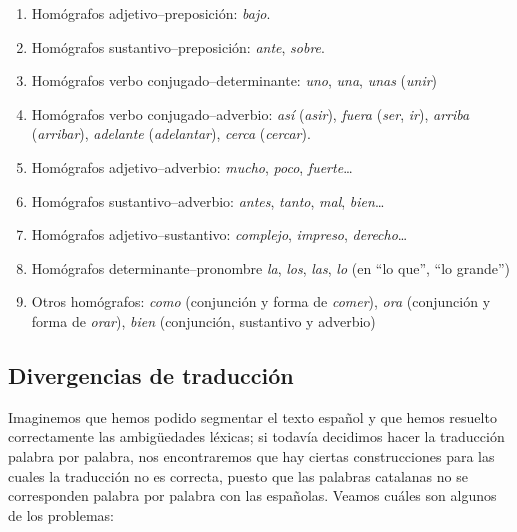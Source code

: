\begin{enumerate}
\item Homógrafos adjetivo--preposición: \emph{bajo}. 

\item Homógrafos sustantivo--preposición: \emph{ante}, \emph{sobre}. 

\item Homógrafos verbo conjugado--determinante: \emph{uno}, \emph{una}, \emph{unas} (\emph{unir}) 

\item Homógrafos verbo conjugado--adverbio: \emph{así} (\emph{asir}), \emph{fuera} (\emph{ser}, \emph{ir}), \emph{ arriba} (\emph{arribar}), {\em adelante} (\emph{adelantar}), \emph{cerca} (\emph{cercar}). 

\item Homógrafos adjetivo--adverbio: \emph{mucho}, \emph{poco}, {\em fuerte}\ldots 

\item Homógrafos sustantivo--adverbio: \emph{antes}, \emph{tanto}, \emph{mal}, \emph{bien}\ldots 

\item Homógrafos adjetivo--sustantivo: \emph{complejo}, {\em impreso}, \emph{derecho}\ldots 

\item Homógrafos determinante--pronombre \emph{la}, \emph{los}, \emph{las}, \emph{lo} (en ``lo que'', ``lo grande'') 

\item Otros homógrafos: \emph{como} (conjunción y forma de \emph{comer}), \emph{ora} (conjunción y forma de \emph{orar}), \emph{bien} (conjunción, sustantivo y adverbio) 

\end{enumerate} 

\subsection{Divergencias de traducción}\label{se:divergenciestrad} 

Imaginemos que hemos podido segmentar el texto español y que hemos resuelto correctamente las ambigüedades léxicas; si todavía decidimos hacer la traducción palabra por palabra, nos encontraremos que hay ciertas construcciones para las cuales la traducción no es correcta, puesto que las palabras catalanas no se corresponden palabra por palabra con las españolas. Veamos cuáles son algunos de los problemas: 

